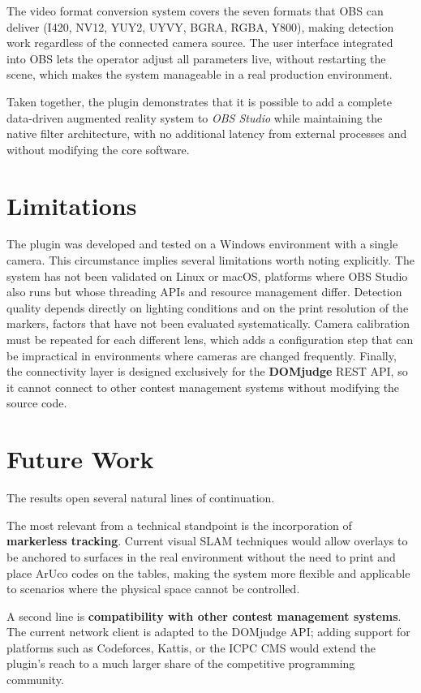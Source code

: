 The video format conversion system covers the seven formats that OBS can deliver (I420, NV12, YUY2, UYVY, BGRA, RGBA, Y800), making detection work regardless of the connected camera source. The user interface integrated into OBS lets the operator adjust all parameters live, without restarting the scene, which makes the system manageable in a real production environment.

Taken together, the plugin demonstrates that it is possible to add a complete data-driven augmented reality system to \textit{OBS Studio} while maintaining the native filter architecture, with no additional latency from external processes and without modifying the core software.

\section{Limitations}

The plugin was developed and tested on a Windows environment with a single camera. This circumstance implies several limitations worth noting explicitly. The system has not been validated on Linux or macOS, platforms where OBS Studio also runs but whose threading APIs and resource management differ. Detection quality depends directly on lighting conditions and on the print resolution of the markers, factors that have not been evaluated systematically. Camera calibration must be repeated for each different lens, which adds a configuration step that can be impractical in environments where cameras are changed frequently. Finally, the connectivity layer is designed exclusively for the \textbf{DOMjudge} \citep{DOMjudge} REST API, so it cannot connect to other contest management systems without modifying the source code.

\section{Future Work}

The results open several natural lines of continuation.

The most relevant from a technical standpoint is the incorporation of \textbf{markerless tracking}. Current visual SLAM techniques \citep{MurArtal2015} would allow overlays to be anchored to surfaces in the real environment without the need to print and place ArUco codes on the tables, making the system more flexible and applicable to scenarios where the physical space cannot be controlled.

A second line is \textbf{compatibility with other contest management systems}. The current network client is adapted to the DOMjudge API; adding support for platforms such as Codeforces, Kattis, or the ICPC CMS would extend the plugin's reach to a much larger share of the competitive programming community.

